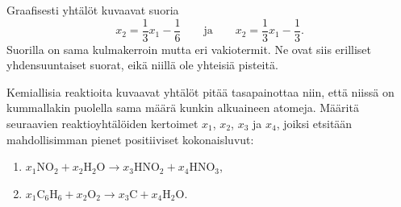 \documentclass[11pt,a4paper]{amsart}
\begin{document}
\begin{solution}
\begin{enumerate}[label=\alph*), nosep]
    \begin{samepage}
      Graafisesti yhtälöt kuvaavat suoria
      \[
        x_2=\frac13x_1-\frac16
        \qquad\text{ja}\qquad
        x_2=\frac13x_1-\frac13.
      \]
      Suorilla on sama kulmakerroin mutta eri vakiotermit. Ne ovat siis
      erilliset yhdensuuntaiset suorat, eikä niillä ole yhteisiä pisteitä.
      \begin{center}
      \end{center}
    \end{samepage}
\end{enumerate}
\end{solution}

\begin{exercise}
Kemiallisia reaktioita kuvaavat yhtälöt pitää tasapainottaa niin, että
niissä on kummallakin puolella sama määrä kunkin alkuaineen atomeja.
Määritä seuraavien reaktioyhtälöiden kertoimet \(x_1\), \(x_2\), \(x_3\)
ja \(x_4\), joiksi etsitään mahdollisimman pienet
positiiviset kokonaisluvut:
\begin{enumerate}[label=(\alph*)]
  \item \(x_1\mathrm{NO}_2 + x_2\mathrm{H}_2\mathrm{O}
    \to x_3\mathrm{HNO}_2 + x_4\mathrm{HNO}_3\),
  \item \(x_1\mathrm{C}_6\mathrm{H}_6 + x_2\mathrm{O}_2
    \to x_3\mathrm{C} + x_4\mathrm{H}_2\mathrm{O}\).
\end{enumerate}
\end{exercise}
\end{document}
